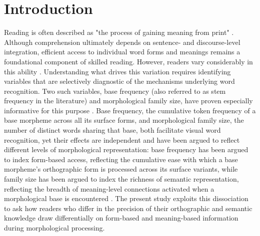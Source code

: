 	\section{Introduction}

Reading is often described as "the process of gaining meaning from print" \citep[][p.~34]{raynerHowPsychologicalScience2001}. Although comprehension ultimately depends on sentence- and discourse-level integration, efficient access to individual word forms and meanings remains a foundational component of skilled reading. However, readers vary considerably in this ability \citep{perfettiReadingAbilityLexical2007, castlesHowDoesOrthographic2006, stanovichExposurePrintOrthographic1989}. Understanding what drives this variation requires identifying variables that are selectively diagnostic of the mechanisms underlying word recognition. Two such variables, base frequency (also referred to as stem frequency in the literature) and morphological family size, have proven especially informative for this purpose \citep{taftMorphologicalDecompositionReverse2004, taftRecognitionAffixedWords1979, dejongMorphologicalFamilySize2000, bertramEffectsFamilySize2000}. Base frequency, the cumulative token frequency of a base morpheme across all its surface forms, and morphological family size, the number of distinct words sharing that base, both facilitate visual word recognition, yet their effects are independent and have been argued to reflect different levels of morphological representation: base frequency has been argued to index form-based access, reflecting the cumulative ease with which a base morpheme's orthographic form is processed across its surface variants, while family size has been argued to index the richness of semantic representation, reflecting the breadth of meaning-level connections activated when a morphological base is encountered \citep{schreuderHowComplexSimplex1997}. The present study exploits this dissociation to ask how readers who differ in the precision of their orthographic and semantic knowledge draw differentially on form-based and meaning-based information during morphological processing.

